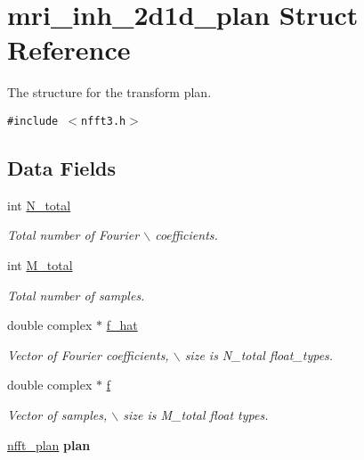 \hypertarget{structmri__inh__2d1d__plan}{
\section{mri\_\-inh\_\-2d1d\_\-plan Struct Reference}
\label{structmri__inh__2d1d__plan}
}
The structure for the transform plan.  


{\tt \#include $<$nfft3.h$>$}

\subsection*{Data Fields}
\begin{CompactItemize}
\item 
\hypertarget{structmri__inh__2d1d__plan_o0}{
int \hyperlink{structmri__inh__2d1d__plan_o0}{N\_\-total}}
\label{structmri__inh__2d1d__plan_o0}

\begin{CompactList}\small\item\em Total number of Fourier $\backslash$ coefficients. \item\end{CompactList}\item 
\hypertarget{structmri__inh__2d1d__plan_o1}{
int \hyperlink{structmri__inh__2d1d__plan_o1}{M\_\-total}}
\label{structmri__inh__2d1d__plan_o1}

\begin{CompactList}\small\item\em Total number of samples. \item\end{CompactList}\item 
\hypertarget{structmri__inh__2d1d__plan_o2}{
double complex $\ast$ \hyperlink{structmri__inh__2d1d__plan_o2}{f\_\-hat}}
\label{structmri__inh__2d1d__plan_o2}

\begin{CompactList}\small\item\em Vector of Fourier coefficients, $\backslash$ size is N\_\-total float\_\-types. \item\end{CompactList}\item 
\hypertarget{structmri__inh__2d1d__plan_o3}{
double complex $\ast$ \hyperlink{structmri__inh__2d1d__plan_o3}{f}}
\label{structmri__inh__2d1d__plan_o3}

\begin{CompactList}\small\item\em Vector of samples, $\backslash$ size is M\_\-total float types. \item\end{CompactList}\item 
\hypertarget{structmri__inh__2d1d__plan_o4}{
\hyperlink{structnfft__plan}{nfft\_\-plan} {\bf plan}}
\label{structmri__inh__2d1d__plan_o4}


\end{CompactItemize}
